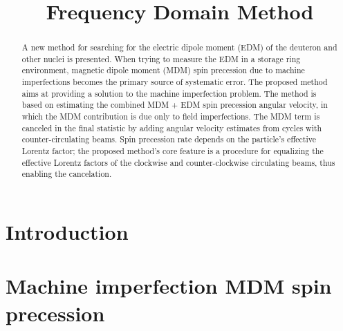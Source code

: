 \documentclass[12pt]{article}
\title{Frequency Domain Method}
\newcommand{\avg}[1]{\langle{#1}\rangle}
\begin{document}
	\maketitle
	\begin{abstract}
		A new method for searching for the electric dipole moment (EDM) of the deuteron and other nuclei is presented. When trying to measure the EDM in a storage ring environment, magnetic dipole moment (MDM) spin precession due to machine imperfections becomes the primary source of systematic error. The proposed method aims at providing a solution to the machine imperfection problem. The method is based on estimating the combined MDM + EDM spin precession angular velocity, in which the MDM contribution is due only to field imperfections. The MDM term is canceled in the final statistic by  adding angular velocity estimates from cycles with counter-circulating beams. Spin precession rate depends on the particle's effective Lorentz factor; the proposed method's core feature is a procedure for equalizing the effective Lorentz factors of the clockwise and counter-clockwise circulating beams, thus enabling the cancelation.
	\end{abstract}

\tableofcontents

\section{Introduction}

\section{Machine imperfection MDM spin precession}


%
%
\end{document}
